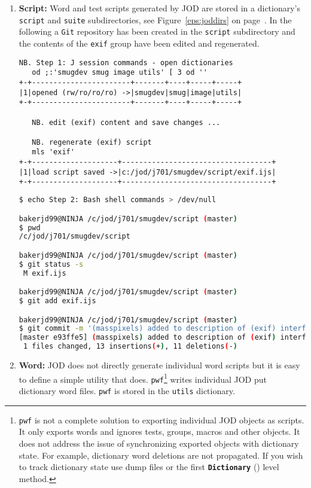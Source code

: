 \begin{enumerate}
\item \textbf{Script:} Word and test scripts generated by JOD are stored
in a dictionary's  \texttt{script} and \texttt{suite} subdirectories, see Figure~\ref{eps:joddirs} on page~\pageref{eps:joddirs}.
In the following a \texttt{Git} repository has been created in the \texttt{script} subdirectory
and the contents of the \texttt{exif} group have been edited and regenerated.

\begin{lstlisting}[frame=single,framerule=0pt,basicstyle=\ttfamily\footnotesize]
   NB. Step 1: J session commands - open dictionaries
   od ;:'smugdev smug image utils' [ 3 od ''
+-+-----------------------+-------+----+-----+-----+
|1|opened (rw/ro/ro/ro) ->|smugdev|smug|image|utils|
+-+-----------------------+-------+----+-----+-----+

   NB. edit (exif) content and save changes ...
   
   NB. regenerate (exif) script
   mls 'exif'
+-+--------------------+-----------------------------------+
|1|load script saved ->|c:/jod/j701/smugdev/script/exif.ijs|
+-+--------------------+-----------------------------------+
\end{lstlisting}

\begin{lstlisting}[language=bash,frame=single,framerule=0pt
,basicstyle=\ttfamily\footnotesize,backgroundcolor=\color{CodeBackGround}]
$ echo Step 2: Bash shell commands > /dev/null

bakerjd99@NINJA /c/jod/j701/smugdev/script (master)
$ pwd
/c/jod/j701/smugdev/script

bakerjd99@NINJA /c/jod/j701/smugdev/script (master)
$ git status -s
 M exif.ijs

bakerjd99@NINJA /c/jod/j701/smugdev/script (master)
$ git add exif.ijs

bakerjd99@NINJA /c/jod/j701/smugdev/script (master)
$ git commit -m '(masspixels) added to description of (exif) interface'
[master e93ffe5] (masspixels) added to description of (exif) interface
 1 files changed, 13 insertions(+), 11 deletions(-)
\end{lstlisting}

\item \textbf{Word:} JOD does not directly generate individual word scripts 
but it is easy to define
a simple utility that does. \texttt{pwf}\footnote{
\texttt{pwf} is not a complete solution to exporting 
individual JOD objects as scripts. It only exports words
 and ignores tests, groups, macros and other objects.
It does not address the issue of synchronizing exported
objects with dictionary state. For example, dictionary word
deletions are not propagated. If you wish to track 
dictionary state use dump files or the first \textbf{\texttt{Dictionary}} (\pageref{it:dictlev})
level method.}
writes individual JOD put dictionary
word files. \texttt{pwf} is stored in the \texttt{utils} dictionary.


\end{enumerate}
